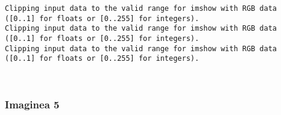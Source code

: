 \documentclass[11pt]{article}
\begin{document}
    \begin{Verbatim}[commandchars=\\\{\}]
Clipping input data to the valid range for imshow with RGB data ([0..1] for floats or [0..255] for integers).
Clipping input data to the valid range for imshow with RGB data ([0..1] for floats or [0..255] for integers).
Clipping input data to the valid range for imshow with RGB data ([0..1] for floats or [0..255] for integers).

    \end{Verbatim}

    \begin{center}
    \end{center}
    { \hspace*{\fill} \\}
    
    \subsubsection{Imaginea 5}\label{imaginea-5}
\end{document}
